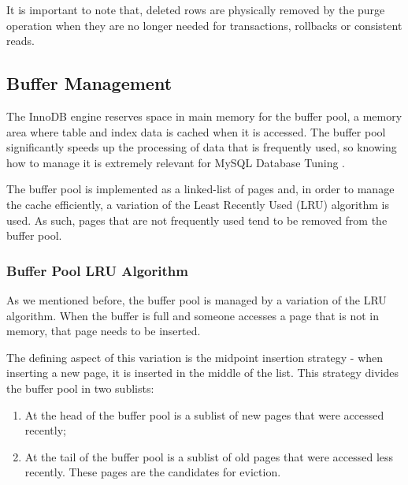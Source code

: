 \documentclass[12pt]{article}
\begin{document}
It is important to note that, deleted rows are physically removed by the purge operation when they are no longer needed for transactions, rollbacks or consistent reads.



\subsection{Buffer Management}
\label{buffer}
The InnoDB engine reserves space in main memory for the buffer pool, a memory area where table and index data is cached when it is accessed. The buffer pool significantly speeds up the processing of data that is frequently used, so knowing how to manage it is extremely relevant for MySQL Database Tuning \parencite{BUFFER_POOL}.

The buffer pool is implemented as a linked-list of pages and, in order to manage the cache efficiently, a variation of the Least Recently Used (LRU) algorithm is used. As such, pages that are not frequently used tend to be removed from the buffer pool.

\subsubsection{Buffer Pool LRU Algorithm}
\label{LRU}
As we mentioned before, the buffer pool is managed by a variation of the LRU algorithm. When the buffer is full and someone accesses a page that is not in memory, that page needs to be inserted. 

The defining aspect of this variation is the midpoint insertion strategy - when inserting a new page, it is inserted in the middle of the list. This strategy divides the buffer pool in two sublists:

\begin{enumerate}
    \item At the head of the buffer pool is a sublist of new pages that were accessed recently;
    \item At the tail of the buffer pool is a sublist of old pages that were accessed less recently. These pages are the candidates for eviction.
\end{enumerate}
\end{document}
